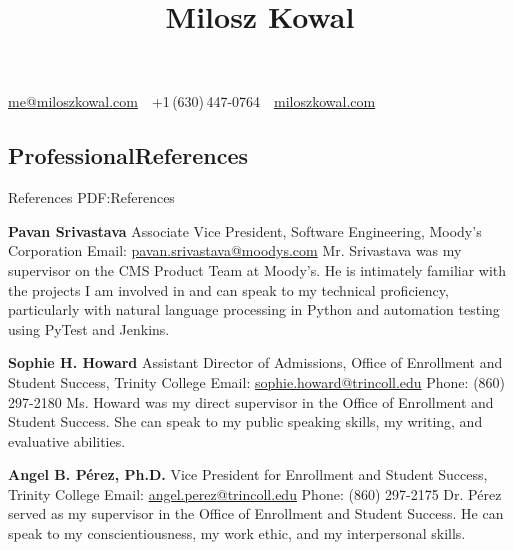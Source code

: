 \documentclass[letterpaper,10pt,oneside]{article}
\newcommand{\CVAuthor}{Milosz Kowal}
\newcommand{\CVWebpage}{https://miloszkowal.com}
\begin{document}

\title{\CVAuthor}

\begin{subtitle}
\begin{comment}
\href{https://goo.gl/maps/rBv3wo3UJLJ2}
{103 Clover Court, Bartlett, IL 60103, USA}
\par
\end{comment}
\href{mailto:me@miloszkowal.com}
{me@miloszkowal.com}
\,\SubBulletSymbol\,
+1\,(630)\,447-0764
\,\SubBulletSymbol\,
\href{\CVWebpage}
{miloszkowal.com}
\end{subtitle}

\begin{body}



\section
{Professional\newline References}
{References}
{PDF:References}

{\textbf{Pavan Srivastava}}
\hfill
\GapNoBreak
\BulletItem
Associate Vice President, Software Engineering, Moody's Corporation
\BulletItem
Email: \href{mailto:ManMei.Wong@moodys.com}{pavan.srivastava@moodys.com}
\BulletItem
Mr. Srivastava was my supervisor on the CMS Product Team at Moody's. He is intimately familiar with the projects I am involved in and can speak to my technical proficiency, particularly with natural language processing in Python and automation testing using PyTest and Jenkins.

\BigGapNoBreak

{\textbf{Sophie H. Howard}}
\hfill
\GapNoBreak
\BulletItem
Assistant Director of Admissions, Office of Enrollment and Student Success, Trinity College
\BulletItem
Email: \href{mailto:sophie.howard@trincoll.edu}{sophie.howard@trincoll.edu}
\BulletItem
Phone: (860) 297-2180
\BulletItem
Ms. Howard was my direct supervisor in the Office of Enrollment and Student Success. She can speak to my public speaking skills, my writing, and evaluative abilities.

\BigGapNoBreak

{\textbf{Angel B. Pérez, Ph.D.}}
\hfill
\GapNoBreak
\BulletItem
Vice President for Enrollment and Student Success, Trinity College
\BulletItem
Email: \href{mailto:angel.perez@trincoll.edu}{angel.perez@trincoll.edu}
\BulletItem
Phone: (860) 297-2175
\BulletItem
Dr. Pérez served as my supervisor in the Office of Enrollment and Student Success. He can speak to my conscientiousness, my work ethic, and my interpersonal skills.


\end{body}
\end{document}
